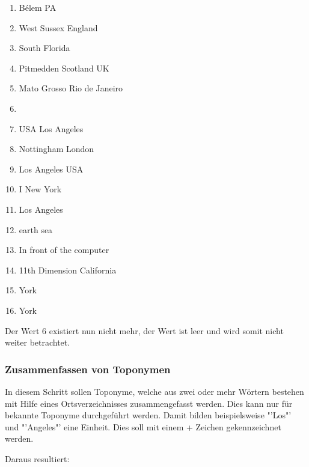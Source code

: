				\begin{multicols}{2}
					\begin{enumerate}
						\item Bélem PA
						\item West Sussex England
						\item South Florida
						\item Pitmedden Scotland UK
						\item Mato Grosso Rio de Janeiro
						\item 
						\item USA Los Angeles
						\item Nottingham London
						\item Los Angeles USA
						\item I New York 
						\item Los Angeles
						\item earth sea
						\item In front of the computer
						\item 11th Dimension California
						\item York
						\item York
					\end{enumerate}
				\end{multicols}

				Der Wert 6 existiert nun nicht mehr, der Wert ist leer und wird somit nicht weiter betrachtet.

			\subsubsection{Zusammenfassen von Toponymen}

				In diesem Schritt sollen Toponyme, welche aus zwei oder mehr Wörtern bestehen mit Hilfe eines Ortsverzeichnisses zusammengefasst werden. 
				Dies kann nur für bekannte Toponyme durchgeführt werden.
				Damit bilden beispielsweise "'Los"' und "'Angeles"' eine Einheit. 
				Dies soll mit einem + Zeichen gekennzeichnet werden.

				Daraus resultiert:

